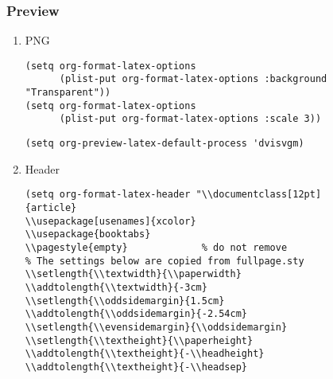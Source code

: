 \documentclass[c]{article}
\theoremstyle{plain}%
\theoremstyle{definition}
\theoremstyle{remark}
\begin{document}
\subsubsection{Preview}
\label{sec:org4a6e02b}
\begin{enumerate}
\item PNG
\label{sec:orga8f1663}
\begin{verbatim}
(setq org-format-latex-options
      (plist-put org-format-latex-options :background "Transparent"))
(setq org-format-latex-options
      (plist-put org-format-latex-options :scale 3))
\end{verbatim}
\begin{verbatim}
(setq org-preview-latex-default-process 'dvisvgm)
\end{verbatim}
\item Header
\label{sec:orga39c94f}
\begin{verbatim}
(setq org-format-latex-header "\\documentclass[12pt]
{article}
\\usepackage[usenames]{xcolor}
\\usepackage{booktabs}
\\pagestyle{empty}             % do not remove
% The settings below are copied from fullpage.sty
\\setlength{\\textwidth}{\\paperwidth}
\\addtolength{\\textwidth}{-3cm}
\\setlength{\\oddsidemargin}{1.5cm}
\\addtolength{\\oddsidemargin}{-2.54cm}
\\setlength{\\evensidemargin}{\\oddsidemargin}
\\setlength{\\textheight}{\\paperheight}
\\addtolength{\\textheight}{-\\headheight}
\\addtolength{\\textheight}{-\\headsep}

\end{verbatim}
\end{enumerate}
\end{document}

